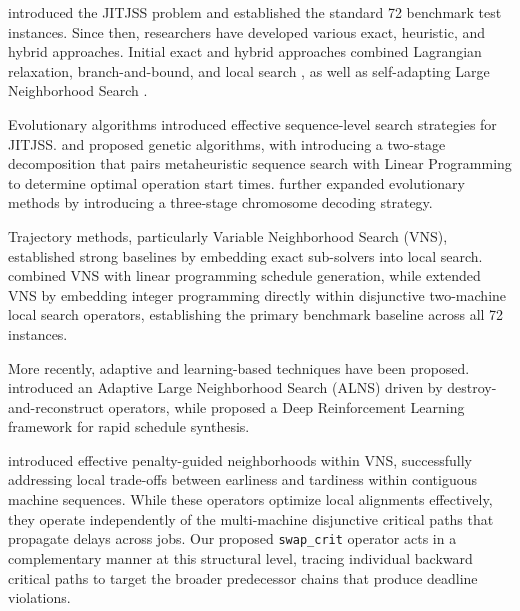 \citet{baptiste2008lagrangian} introduced the JITJSS problem and established the standard 72 benchmark test instances.
Since then, researchers have developed various exact, heuristic, and hybrid approaches.
Initial exact and hybrid approaches combined Lagrangian relaxation, branch-and-bound, and local search \citep{baptiste2008lagrangian, monette2009just}, as well as self-adapting Large Neighborhood Search \citep{laborie2007self}.

Evolutionary algorithms introduced effective sequence-level search strategies for JITJSS.
\citet{araujo2009genetic} and \citet{dos2010combination} proposed genetic algorithms, with \citet{dos2010combination} introducing a two-stage decomposition that pairs metaheuristic sequence search with Linear Programming to determine optimal operation start times.
\citet{yang2012improved} further expanded evolutionary methods by introducing a three-stage chromosome decoding strategy.

Trajectory methods, particularly Variable Neighborhood Search (VNS), established strong baselines by embedding exact sub-solvers into local search.
\citet{wang2014variable} combined VNS with linear programming schedule generation, while \citet{ahmadian2021meta} extended VNS by embedding integer programming directly within disjunctive two-machine local search operators, establishing the primary benchmark baseline across all 72 instances.

More recently, adaptive and learning-based techniques have been proposed.
\citet{abderrazzak2022adaptive} introduced an Adaptive Large Neighborhood Search (ALNS) driven by destroy-and-reconstruct operators, while \citet{sabri2023reinforcement} proposed a Deep Reinforcement Learning framework for rapid schedule synthesis.

\citet{wang2014variable} introduced effective penalty-guided neighborhoods within VNS, successfully addressing local trade-offs between earliness and tardiness within contiguous machine sequences.
While these operators optimize local alignments effectively, they operate independently of the multi-machine disjunctive critical paths that propagate delays across jobs.
Our proposed \texttt{swap\_crit} operator acts in a complementary manner at this structural level, tracing individual backward critical paths to target the broader predecessor chains that produce deadline violations.

